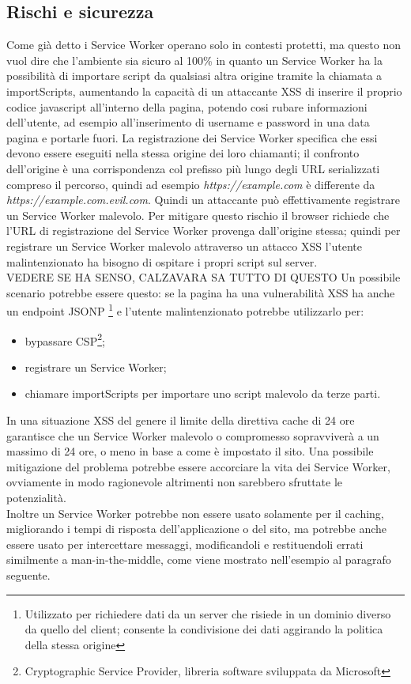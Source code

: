 \documentclass[11pt ,a4paper , twoside , openright ]{article}
\begin{document}
\subsection{Rischi e sicurezza \cite{rif29}}
Come già detto i Service Worker operano solo in contesti protetti, ma questo non vuol dire che l'ambiente sia sicuro al 100\% in quanto un Service Worker ha la possibilità di importare script da qualsiasi altra origine tramite la chiamata a importScripts, aumentando la capacità di un attaccante XSS di inserire il proprio codice javascript all'interno della pagina, potendo cosi rubare informazioni dell'utente, ad esempio all'inserimento di username e password in una data pagina e portarle fuori. La registrazione dei Service Worker specifica che essi devono essere eseguiti nella stessa origine dei loro chiamanti; il confronto dell'origine è una corrispondenza col prefisso più lungo degli URL serializzati compreso il percorso, quindi ad esempio \textit{https://example.com} è differente da \textit{https://example.com.evil.com}. Quindi un attaccante può effettivamente registrare un Service Worker malevolo. Per mitigare questo rischio il browser richiede che l'URL di registrazione del Service Worker provenga dall'origine stessa; quindi per registrare un Service Worker malevolo attraverso un attacco XSS l'utente malintenzionato ha bisogno di ospitare i propri script sul server.
\\
VEDERE SE HA SENSO, CALZAVARA SA TUTTO DI QUESTO
Un possibile scenario potrebbe essere questo: se la pagina ha una vulnerabilità XSS ha anche un endpoint JSONP \footnote{Utilizzato per richiedere dati da un server che risiede in un dominio diverso da quello del client; consente la condivisione dei dati aggirando la politica della stessa origine} e l'utente malintenzionato potrebbe utilizzarlo per:
\begin{itemize}
	\item bypassare CSP\footnote{Cryptographic Service Provider, libreria software sviluppata da Microsoft};
	\item registrare un Service Worker; 
	\item chiamare importScripts per importare uno script malevolo da terze parti.
\end{itemize}
In una situazione XSS del genere il limite della direttiva cache di 24 ore garantisce che un Service Worker malevolo o compromesso sopravviverà a un massimo di 24 ore, o meno in base a come è impostato il sito. Una possibile mitigazione del problema potrebbe essere accorciare la vita dei Service Worker, ovviamente in modo ragionevole altrimenti non sarebbero sfruttate le potenzialità.
\\
Inoltre un Service Worker potrebbe non essere usato solamente per il caching, migliorando i tempi di risposta dell'applicazione o del sito, ma potrebbe anche essere usato per intercettare messaggi, modificandoli e restituendoli errati similmente a man-in-the-middle, come viene mostrato nell'esempio al paragrafo seguente.
\end{document}
